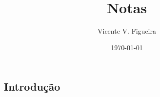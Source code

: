 \documentclass[twoside]{amsart}
\title{
Notas
}
\author{
  Vicente V. Figueira
       }
\date{\today}
\numberwithin{equation}{section}
\begin{document}
\maketitle

\tableofcontents


\begin{refsection}
\section{Introdução}



\printbibliography[heading=subbibliography]
\end{refsection}

\end{document}
